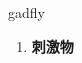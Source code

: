 
\begin{frame}
{\huge gadfly}
\begin{center}
\begin{enumerate}\Large
  \item \textbf{刺激物}
\end{enumerate}
\end{center}
\end{frame}
